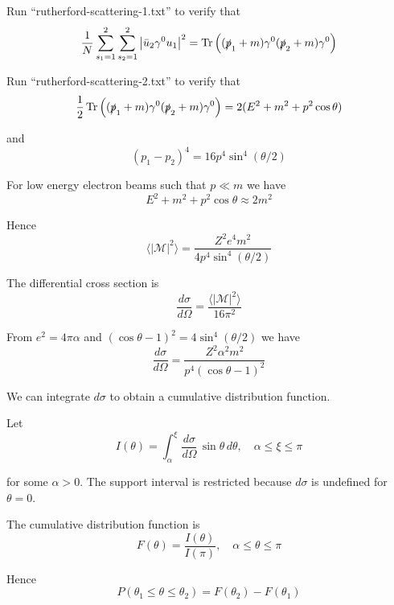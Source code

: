 \documentclass[12pt]{article}
\begin{document}
\noindent
Run ``rutherford-scattering-1.txt'' to verify that
$$
\frac{1}{N}\sum_{s_1=1}^2\sum_{s_2=1}^2\left|\bar{u}_2\gamma^0 u_1\right|^2
=\mathop{\rm Tr}\left((\slashed{p}_1+m)\gamma^0(\slashed{p}_2+m)\gamma^0\right)
$$

\noindent
Run ``rutherford-scattering-2.txt'' to verify that
$$
\frac{1}{2}
\mathop{\rm Tr}\left((\slashed{p}_1+m)\gamma^0(\slashed{p}_2+m)\gamma^0\right)
=2(E^2+m^2+p^2\cos\theta)
$$

\noindent
and
\begin{equation*}
(p_1-p_2)^4=16p^4\sin^4(\theta/2)
\end{equation*}

\noindent
For low energy electron beams such that $p\ll m$ we have
\begin{equation*}
E^2+m^2+p^2\cos\theta\approx2m^2
\end{equation*}

\noindent
Hence
\begin{equation*}
\langle|\mathcal{M}|^2\rangle=\frac{Z^2e^4m^2}{4p^4\sin^4(\theta/2)}
\end{equation*}

\noindent
The differential cross section is
\begin{equation*}
\frac{d\sigma}{d\Omega}=\frac{\langle|\mathcal{M}|^2\rangle}{16\pi^2}
\end{equation*}

\noindent
From $e^2=4\pi\alpha$ and $(\cos\theta-1)^2=4\sin^4(\theta/2)$ we have
\begin{equation*}
\frac{d\sigma}{d\Omega}
=\frac{Z^2\alpha^2m^2}{p^4(\cos\theta-1)^2}
\end{equation*}

\newpage
\noindent
We can integrate $d\sigma$ to obtain a cumulative distribution function.

\bigskip
\noindent
Let
\begin{equation*}
I(\theta)=\int_\alpha^\xi\frac{d\sigma}{d\Omega}\,\sin\theta\,d\theta,
\quad\alpha\le\xi\le\pi
\end{equation*}

\noindent
for some $\alpha>0$.
The support interval is restricted because $d\sigma$ is undefined for $\theta=0$.

\bigskip
\noindent
The cumulative distribution function is
\begin{equation*}
F(\theta)=\frac{I(\theta)}{I(\pi)},
\quad\alpha\le\theta\le\pi
\end{equation*}

\noindent
Hence
\begin{equation*}
P(\theta_1\le\theta\le\theta_2)=F(\theta_2)-F(\theta_1)
\end{equation*}
\end{document}
